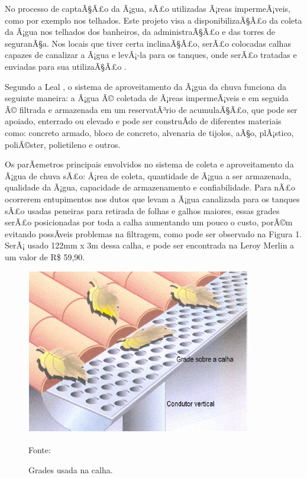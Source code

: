 No processo de captaÃ§Ã£o da Ã¡gua, sÃ£o utilizadas Ã¡reas impermeÃ¡veis, como por exemplo nos telhados. Este projeto visa a disponibilizaÃ§Ã£o da coleta da Ã¡gua nos telhados dos banheiros, da administraÃ§Ã£o e das torres de seguranÃ§a. Nos locais que tiver certa inclinaÃ§Ã£o, serÃ£o colocadas calhas capazes de canalizar a Ã¡gua e levÃ¡-la para os tanques, onde serÃ£o tratadas e enviadas para sua utilizaÃ§Ã£o \cite{MAY}.

Segundo a Leal \cite{LEAL} , o sistema de aproveitamento da Ã¡gua da chuva funciona da seguinte maneira: a Ã¡gua Ã© coletada de Ã¡reas impermeÃ¡veis e em seguida Ã© filtrada e armazenada em um reservatÃ³rio de acumulaÃ§Ã£o, que pode ser apoiado, enterrado ou elevado e pode ser construÃ­do de diferentes materiais como: concreto armado, bloco de concreto, alvenaria de tijolos, aÃ§o, plÃ¡stico, poliÃ©ster, polietileno e outros. 

Os parÃ¢metros principais envolvidos no sistema de coleta e aproveitamento da Ã¡gua de chuva sÃ£o: Ã¡rea de coleta, quantidade de Ã¡gua a ser armazenada, qualidade da Ã¡gua, capacidade de armazenamento e confiabilidade. 
Para nÃ£o ocorrerem entupimentos nos dutos que levam a Ã¡gua canalizada para os tanques sÃ£o usadas peneiras para retirada de folhas e galhos maiores, essas grades serÃ£o posicionadas por toda a calha aumentando um pouco o custo, porÃ©m evitando possÃ­veis problemas na filtragem, como pode ser observado na Figura 1. SerÃ¡ usado 122mm x 3m dessa calha, e pode ser encontrada na  Leroy Merlin a um valor de R\$ 59,90.

\begin{figure}[H]
	 \centering
	\label{Grades usada na calha.}
	 \includegraphics[scale=0.6]{captacao/5.png}
	 \caption{Grades usada na calha.}
	 \small{Fonte: \cite{WATERFALL}}
\end{figure}

